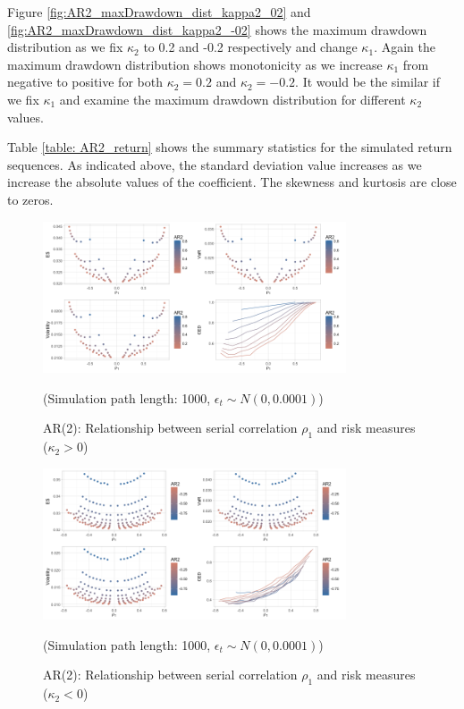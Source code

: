 \documentclass[11pt]{article}
\begin{document}
Figure \ref{fig:AR2_maxDrawdown_dist_kappa2_02} and \ref{fig:AR2_maxDrawdown_dist_kappa2_-02} shows the maximum drawdown distribution as we fix $\kappa_2$ to 0.2 and -0.2 respectively and change $\kappa_1$. Again the maximum drawdown distribution shows monotonicity as we increase $\kappa_1$ from negative to positive for both $\kappa_2 = 0.2 $ and $\kappa_2 = -0.2$. It would be the similar if we fix $\kappa_1$ and examine the maximum drawdown distribution for different $\kappa_2$ values.  

Table \ref{table: AR2_return} shows the summary statistics for the simulated return sequences. As indicated above, the standard deviation value increases as we increase the absolute values of the coefficient. The skewness and kurtosis are close to zeros.

\begin{figure}[H]
\centering
\includegraphics[width = 0.8\textwidth]{../figures/simulation/AR2_risk_measures_pos}
\caption{AR(2): Relationship between serial correlation $\rho_1$ and risk measures ($\kappa_2 > 0$)}
(Simulation path length: 1000, $\epsilon_t \sim N(0, 0.0001)$)
\label{fig:AR2_risk_measures_pos}
\end{figure}

\begin{figure}[H]
\centering
\includegraphics[width = 0.8\textwidth]{../figures/simulation/AR2_risk_measures_neg}
\caption{AR(2): Relationship between serial correlation $\rho_1$ and risk measures ($\kappa_2 < 0$)}
(Simulation path length: 1000, $\epsilon_t \sim N(0, 0.0001)$)
\label{fig:AR2_risk_measures_neg}
\end{figure}
\end{document}
